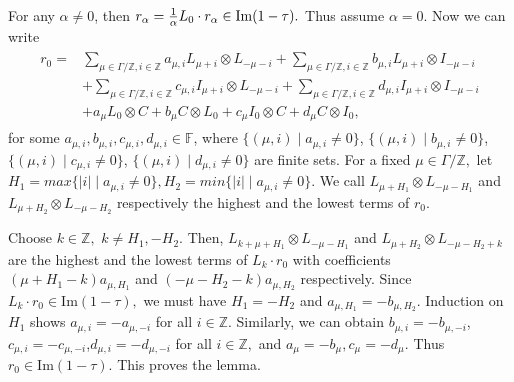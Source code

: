\documentclass{amsart}
\theoremstyle{definition}
\theoremstyle{remark}
\numberwithin{equation}{subsection}
\numberwithin{equation}{section}
\begin{document}
For any $\alpha\ne0$, then $r_\alpha=\frac{1}{\alpha}L_0\cdot
r_\alpha\in {\rm Im}(1-\tau).$ Thus assume $\alpha=0.$ Now we can
write
\begin{eqnarray}\label{equa2.37}
\begin{split}
r_0=&\underset{\mu\in \Gamma/\mathbb{Z},i\in
\mathbb{Z}}{\sum}{a_{\mu,i} L_{\mu+i} \otimes L_{-\mu-i}}+
\underset{\mu\in \Gamma/\mathbb{Z},i\in \mathbb{Z}}{\sum}{b_{\mu,i}
L_{\mu+i} \otimes I_{-\mu-i}}\\
&+\underset{\mu\in \Gamma/\mathbb{Z},i\in
\mathbb{Z}}{\sum}{c_{\mu,i} I_{\mu+i} \otimes L_{-\mu-i}}+
\underset{\mu\in \Gamma/\mathbb{Z},i\in
\mathbb{Z}}{\sum}{d_{\mu,i} I_{\mu+i} \otimes I_{-\mu-i}}\\
&+ a_{\mu}L_{0}\otimes C+b_{\mu} C \otimes L_{0}+c_{\mu}I_{0}\otimes
C+d_{\mu}C \otimes I_{0},
\end{split}
\end{eqnarray}
for some
 $a_{\mu,i},b_{\mu,i},c_{\mu,i},d_{\mu,i} \in
  \mathbb{F}$, where $\{(\mu,i)\mid a_{\mu,i}\neq 0 \}$,  $\{(\mu,i)\mid b_{\mu,i}\neq 0
  \}$, $\{(\mu,i)\mid c_{\mu,i}\neq 0 \}$, $\{(\mu,i)\mid d_{\mu,i}\neq 0
  \}$ are finite sets. For a fixed $\mu \in \Gamma/\mathbb{Z},$ let
  $H_1=max\{|i| \mid a_{\mu,i}\neq 0\},H_2=min\{|i |\mid a_{\mu,i}\neq
  0\}.$  We call $L_{\mu+H_1}\otimes L_{-\mu-H_1}$ and $L_{\mu+H_2}\otimes L_{-\mu-H_2}$
 respectively the highest and the lowest terms of $r_0.$

 Choose $k\in \mathbb{Z},$ $k\neq H_1,-H_2.$ Then, $L_{k+\mu+H_1}\otimes
 L_{-\mu-H_1}$  and $L_{\mu+H_2}\otimes L_{-\mu-H_2+k}$ are the
 highest and the lowest terms of $L_k\cdot r_0$ with coefficients $(\mu+H_1-k)a_{\mu,H_1}$
and $(-\mu-H_2-k)a_{\mu,H_2}$ respectively. Since $L_k\cdot r_0\in
\mathrm{Im}(1-\tau),$ we must have $H_1=-H_2$ and
$a_{\mu,H_1}=-b_{\mu,H_2}.$ Induction on $H_1$ shows
$a_{\mu,i}=-a_{\mu,-i}$ for all $i\in\mathbb{Z}$. Similarly, we can
obtain
$b_{\mu,i}=-b_{\mu,-i}$,$c_{\mu,i}=-c_{\mu,-i}$,$d_{\mu,i}=-d_{\mu,-i}$
for all $i\in \mathbb{Z},$ and $a_\mu=-b_\mu,c_\mu=-d_\mu.$ Thus
$r_0\in \mathrm{Im}(1-\tau).$ This proves the lemma.
\end{document}
